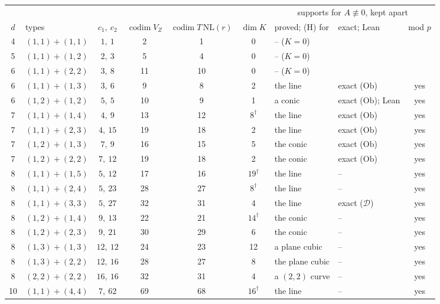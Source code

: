\documentclass[11pt]{article}
\numberwithin{equation}{section}
\theoremstyle{remark}
\newcommand{\NL}{\mathrm{NL}}
\newcommand{\VZ}{V_Z}
\newcommand{\cD}{\mathcal{D}}
\newcommand{\codim}{\operatorname{codim}}
\newcommand{\Ob}{\mathrm{Ob}}
\begin{document}
\begin{table}[!t]
\centering\footnotesize
\begin{tabular}{@{}clccccllc@{}}
\toprule
 & & & & & & \multicolumn{3}{c}{supports for $A\not\equiv0$, kept apart}\\
\cmidrule(l){7-9}
$d$ & types & $c_1,\ c_2$ & $\codim\VZ$ & $\codim T\,\NL(r)$ & $\dim K$ & proved; (H) for &
 exact; Lean & mod $p$\\
\midrule
4 & $(1,1)+(1,1)$ & $1,\ 1$ & 2 & 1 & 0 & \multicolumn{3}{l}{-- ($K=0$)}\\
5 & $(1,1)+(1,2)$ & $2,\ 3$ & 5 & 4 & 0 & \multicolumn{3}{l}{-- ($K=0$)}\\
6 & $(1,1)+(2,2)$ & $3,\ 8$ & 11 & 10 & 0 & \multicolumn{3}{l}{-- ($K=0$)}\\
6 & $(1,1)+(1,3)$ & $3,\ 6$ & 9 & 8 & 2 & the line & exact ($\Ob$) & yes\\
6 & $(1,2)+(1,2)$ & $5,\ 5$ & 10 & 9 & 1 & a conic & exact ($\Ob$); Lean & yes\\
7 & $(1,1)+(1,4)$ & $4,\ 9$ & 13 & 12 & $8^\dagger$ & the line & exact ($\Ob$) & yes\\
7 & $(1,1)+(2,3)$ & $4,\ 15$ & 19 & 18 & 2 & the line & exact ($\Ob$) & yes\\
7 & $(1,2)+(1,3)$ & $7,\ 9$ & 16 & 15 & 5 & the conic & exact ($\Ob$) & yes\\
7 & $(1,2)+(2,2)$ & $7,\ 12$ & 19 & 18 & 2 & the conic & exact ($\Ob$) & yes\\
8 & $(1,1)+(1,5)$ & $5,\ 12$ & 17 & 16 & $19^\dagger$ & the line & -- & yes\\
8 & $(1,1)+(2,4)$ & $5,\ 23$ & 28 & 27 & $8^\dagger$ & the line & -- & yes\\
8 & $(1,1)+(3,3)$ & $5,\ 27$ & 32 & 31 & 4 & the line & exact ($\cD$) & yes\\
8 & $(1,2)+(1,4)$ & $9,\ 13$ & 22 & 21 & $14^\dagger$ & the conic & -- & yes\\
8 & $(1,2)+(2,3)$ & $9,\ 21$ & 30 & 29 & 6 & the conic & -- & yes\\
8 & $(1,3)+(1,3)$ & $12,\ 12$ & 24 & 23 & 12 & a plane cubic & -- & yes\\
8 & $(1,3)+(2,2)$ & $12,\ 16$ & 28 & 27 & 8 & the plane cubic & -- & yes\\
8 & $(2,2)+(2,2)$ & $16,\ 16$ & 32 & 31 & 4 & a $(2,2)$ curve & -- & yes\\
10 & $(1,1)+(4,4)$ & $7,\ 62$ & 69 & 68 & $16^\dagger$ & the line & -- & yes\\
\bottomrule
\end{tabular}

\end{table}
\end{document}
